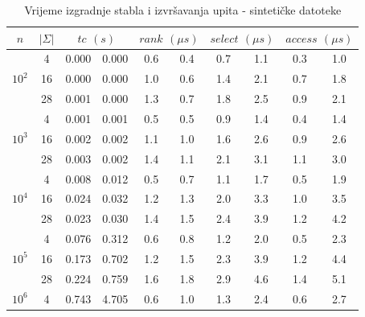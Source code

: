 \documentclass[times, utf8, seminar, numeric]{fer}
\begin{document}
\begin{table}[h]
\caption{Vrijeme izgradnje stabla i izvršavanja upita - sintetičke datoteke}
\label{table:sin_time}
\centering
  \begin{tabular}{c|c|c|c|c|c|c|c|c|c}
    $n$ & $|\Sigma|$ & \multicolumn{2}{c|}{$tc$ $(s)$} &
    \multicolumn{2}{c|}{$rank$ $(\mu s)$} & \multicolumn{2}{c|}{$select$ $(\mu s)$} & \multicolumn{2}{c}{$access$ $(\mu s)$}\\ \hline
    \multirow{3}{*}{$10^2$}
      & \num{4} & \num{0.000} & \num{0.000} & \num{0.6} & \num{0.4} & \num{0.7} & \num{1.1} & \num{0.3} & \num{1.0} \\
      & \num{16} & \num{0.000} & \num{0.000} & \num{1.0} & \num{0.6} & \num{1.4} & \num{2.1} & \num{0.7} & \num{1.8} \\
      & \num{28} & \num{0.001} & \num{0.000} & \num{1.3} & \num{0.7} & \num{1.8} & \num{2.5} & \num{0.9} & \num{2.1} \\
    \hline
    \multirow{3}{*}{$10^3$}
      & \num{4} & \num{0.001} & \num{0.001} & \num{0.5} & \num{0.5} & \num{0.9} & \num{1.4} & \num{0.4} & \num{1.4} \\
      & \num{16} & \num{0.002} & \num{0.002} & \num{1.1} & \num{1.0} & \num{1.6} & \num{2.6} & \num{0.9} & \num{2.6} \\
      & \num{28} & \num{0.003} & \num{0.002} & \num{1.4} & \num{1.1} & \num{2.1} & \num{3.1} & \num{1.1} & \num{3.0} \\
    \hline
    \multirow{3}{*}{$10^4$}
      & \num{4} & \num{0.008} & \num{0.012} & \num{0.5} & \num{0.7} & \num{1.1} & \num{1.7} & \num{0.5} & \num{1.9} \\
      & \num{16} & \num{0.024} & \num{0.032} & \num{1.2} & \num{1.3} & \num{2.0} & \num{3.3} & \num{1.0} & \num{3.5} \\
      & \num{28} & \num{0.023} & \num{0.030} & \num{1.4} & \num{1.5} & \num{2.4} & \num{3.9} & \num{1.2} & \num{4.2} \\
    \hline
    \multirow{3}{*}{$10^5$}
      & \num{4} & \num{0.076} & \num{0.312} & \num{0.6} & \num{0.8} & \num{1.2} & \num{2.0} & \num{0.5} & \num{2.3} \\
      & \num{16} & \num{0.173} & \num{0.702} & \num{1.2} & \num{1.5} & \num{2.3} & \num{3.9} & \num{1.2} & \num{4.4} \\
      & \num{28} & \num{0.224} & \num{0.759} & \num{1.6} & \num{1.8} & \num{2.9} & \num{4.6} & \num{1.4} & \num{5.1} \\
    \hline
    \multirow{3}{*}{$10^6$}
      & \num{4} & \num{0.743} & \num{4.705} & \num{0.6} & \num{1.0} & \num{1.3} & \num{2.4} & \num{0.6} & \num{2.7} \\

\end{tabular}
\end{table}
\end{document}

